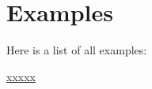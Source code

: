 \section{Examples}
Here is a list of all examples\+:\begin{DoxyCompactItemize}
\item 
\hyperlink{xxxxx-example}{xxxxx}
\end{DoxyCompactItemize}
